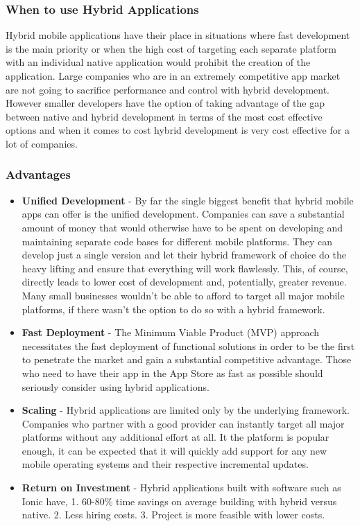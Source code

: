 \newpage
\subsubsection{When to use Hybrid Applications}
Hybrid mobile applications have their place in situations where fast development is the main priority or when the high cost of targeting each separate platform with an individual native application would prohibit the creation of the application. Large companies who are in an extremely competitive app market are not going to sacrifice performance and control with hybrid development. However smaller developers have the option of taking advantage of the gap between native and hybrid development in terms of the most cost effective options and when it comes to cost hybrid development is very cost effective for a lot of companies.


\subsubsection{Advantages}
\begin{itemize}
    \item \textbf{Unified Development} - By far the single biggest benefit that hybrid mobile apps can offer is the unified development. Companies can save a substantial amount of money that would otherwise have to be spent on developing and maintaining separate code bases for different mobile platforms. They can develop just a single version and let their hybrid framework of choice do the heavy lifting and ensure that everything will work flawlessly.
    This, of course, directly leads to lower cost of development and, potentially, greater revenue. Many small businesses wouldn’t be able to afford to target all major mobile platforms, if there wasn’t the option to do so with a hybrid framework.
    \item \textbf{Fast Deployment} - The Minimum Viable Product (MVP) approach necessitates the fast deployment of functional solutions in order to be the first to penetrate the market and gain a substantial competitive advantage. Those who need to have their app in the App Store as fast as possible should seriously consider using hybrid applications.\cite{mvp_paper}
    \item \textbf{Scaling} - Hybrid applications are limited only by the underlying framework. Companies who partner with a good provider can instantly target all major platforms without any additional effort at all. It the platform is popular enough, it can be expected that it will quickly add support for any new mobile operating systems and their respective incremental updates.
    \item \textbf{Return on Investment} - Hybrid applications built with software such as Ionic have, 1. 60-80\% time savings on average building with hybrid versus native. 2. Less hiring costs. 3. Project is more feasible with lower costs. \cite{ionic_hybrid_roi}
\end{itemize}

